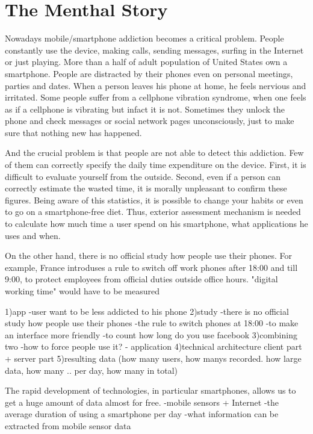 \chapter{The Menthal Story}
\label{chap:menthal_story}

Nowadays mobile/smartphone addiction becomes a critical problem.
People constantly use the device, making calls, sending messages, surfing in the Internet or just playing.
More than a half of adult population of United States own a smartphone.
People are distracted by their phones even on personal meetings, parties and dates.
When a person leaves his phone at home, he feels nervious and irritated.
Some people suffer from a cellphone vibration syndrome, when one feels as if a cellphone is vibrating but infact it is not.
Sometimes they unlock the phone and check messages or social network pages unconsciously, just to make sure that nothing new has happened. 

And the crucial problem is that people are not able to detect this addiction.
Few of them can correctly specify the daily time expenditure on the device.
First, it is difficult to evaluate yourself from the outside.
Second, even if a person can correctly estimate the wasted time, it is morally unpleasant to confirm these figures.
Being aware of this statistics, it is possible to change your habits or even to go on a smartphone-free diet.
Thus, exterior assessment mechanism is needed to calculate how much time a user spend on his smartphone, what applications he uses and when.    

On the other hand, there is no official study how people use their phones.
For example, France introduses a rule to switch off work phones after 18:00 and till 9:00, to protect employees from official duties outside office hours.
"digital working time" would have to be measured 

1)app
-user want to be less addicted to his phone
2)study
-there is no official study how people use their phones
-the rule to switch phones at 18:00
-to make an interface more friendly
-to count how long do you use facebook
3)combining two
-how to force people use it? - application
4)technical architecture
client part + server part
5)resulting data (how many users, how manys recorded. how large data, how many .. per day, how many in total)


The rapid development of technologies, in particular smartphones, allows us to get a huge amount of data almost for free.
-mobile sensors + Internet
-the average duration of using a smartphone per day
-what information can be extracted from mobile sensor data

